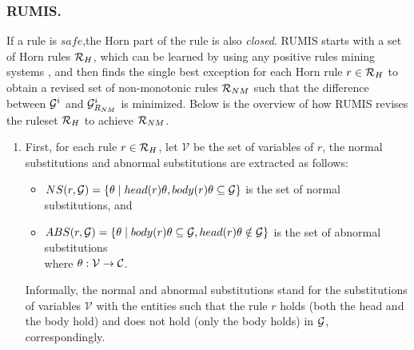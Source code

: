 \subsubsection{RUMIS.} If a rule is $safe$,the Horn part of the rule is also \textit{closed}. RUMIS starts with a set of Horn rules $\mathcal{R}_H$, which can be learned by using any positive rules mining systems \cite{amie,op,rdf2rules}, and then finds the single best exception for each Horn rule $r \in \mathcal{R}_H$ to obtain a revised set of non-monotonic rules $\mathcal{R}_{NM}$ such that the difference between $\mathcal{G}^i$ and $\mathcal{G}^i_{R_{NM}}$ is minimized. Below is the overview of how RUMIS revises the ruleset $\mathcal{R}_H$ to achieve $\mathcal{R}_{NM}$.
\begin{enumerate}
\item First, for each rule $r \in \mathcal{R}_H$, let $\mathcal{V}$ be the set of variables of $r$, the normal substitutions and abnormal substitutions are extracted as follows:
\begin{itemize}
\item $NS(r, \mathcal{G}) = \{\theta \mid head(r)\theta, body(r)\theta \subseteq \mathcal{G}\}$ is the set of normal substitutions, and
\item $ABS(r, \mathcal{G}) = \{\theta \mid body(r)\theta \subseteq \mathcal{G} , head(r)\theta \notin \mathcal{G}\}$ is the set of abnormal substitutions\\
where $\theta: \mathcal{V} \rightarrow \mathcal{C}$.
\end{itemize}
Informally, the normal and abnormal substitutions stand for the substitutions of variables $\mathcal{V}$ with the entities such that the rule $r$ holds (both the head and the body hold) and does not hold (only the body holds) in $\mathcal{G}$, correspondingly.


\end{enumerate}
